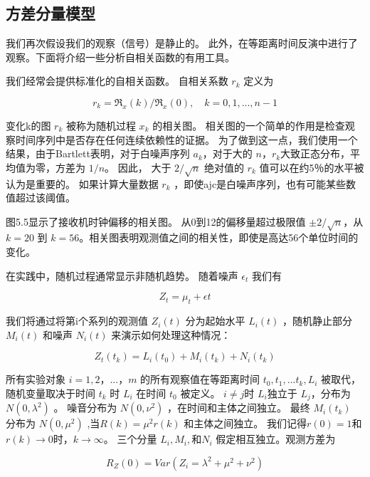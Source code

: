 \subsection{方差分量模型}

我们再次假设我们的观察（信号）是静止的。 此外，在等距离时间反演中进行了观察。下面将介绍一些分析自相关函数的有用工具。

我们经常会提供标准化的自相关函数。 自相关系数 $ r_{k} $ 定义为

\begin{equation}\label{5.35}
r_{k}=\Re_{x}(k)/\Re_{x}(0),\quad k=0,1,...,n-1 
\end{equation}

变化k的图 $ r_{k} $ 被称为随机过程  $ x_{k} $ 的相关图。 相关图的一个简单的作用是检查观察时间序列中是否存在任何连续依赖性的证据。 为了做到这一点，我们使用一个结果，由于Bartlett表明，对于白噪声序列 $ a_{k} $，对于大的 $ n $，$ r_{k}  $大致正态分布，平均值为零，方差为 $  1 / n $。 因此，
大于 $ 2/\sqrt{n} $ 绝对值的  $ r_{k} $ 值可以在约5％的水平被认为是重要的。 如果计算大量数据  $ r_{k} $ ，即使ajc是白噪声序列，也有可能某些数值超过该阈值。

图5.5显示了接收机时钟偏移的相关图。 从0到12的偏移量超过极限值 $ ± 2/\sqrt{n} $，从$  k = 20 $ 到 $ k = 56 $。相关图表明观测值之间的相关性，即使是高达56个单位时间的变化。

在实践中，随机过程通常显示非随机趋势。 随着噪声 $ \epsilon_{t} $ 我们有

\[ Z_{t}=\mu_{t}+\epsilon{t} \]

我们将通过将第i个系列的观测值 $ Z_{i}(t) $ 分为起始水平  $ L_{i}(t) $ ，随机静止部分 $ M_{i}(t) $ 和噪声 $ N_{i}(t) $ 来演示如何处理这种情况：

\begin{equation}\label{5.36}
Z_{t}(t_{k})=L_{i}(t_{0})+M_{i}(t_{k})+N_{i}(t_{k})
\end{equation}

所有实验对象 $  i = 1,2，...，m $ 的所有观察值在等距离时间  $ t_{0},t_{1},...t_{k},L_{i} $ 被取代，随机变量取决于时间  $ t_{k} $ 时  $ L_{i} $ 在时间 $ t_{0} $  被定义。 $ i\neq j $时  $ L_{i} $独立于 $ L_{j} $，分布为  $ N(0,\lambda^{2}) $ 。 噪音分布为 $ N(0,\nu^{2}) $ ，在时间和主体之间独立。 最终 $ M_{i}(t_{k}) $ 分布为 $ N(0,\mu^{2}) $ ,当$ R(k)=\mu^{2}r(k) $ 和主体之间独立。 我们记得$ r(0) = 1 $和 $ r(k)\rightarrow 0 $时，$ k\rightarrow \infty $。 三个分量 $  L_{i},M_{i}, $和$ N_{i} $ 假定相互独立。观测方差为

\[ R_{Z}(0)=Var(Z_{i}=\lambda^{2}+\mu^{2}+\nu^{2}) \]

